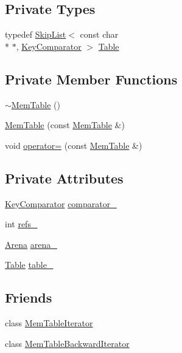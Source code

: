 \subsection*{Private Types}
\begin{DoxyCompactItemize}
\item 
typedef \hyperlink{classleveldb_1_1_skip_list}{Skip\-List}$<$ const char \\*
$\ast$, \hyperlink{structleveldb_1_1_mem_table_1_1_key_comparator}{Key\-Comparator} $>$ \hyperlink{classleveldb_1_1_mem_table_af42bc32bc4c20aea12fc647ee41df058}{Table}
\end{DoxyCompactItemize}
\subsection*{Private Member Functions}
\begin{DoxyCompactItemize}
\item 
\hyperlink{classleveldb_1_1_mem_table_a5d61fe1bfd5265b3f6978495e9bbfeb0}{$\sim$\-Mem\-Table} ()
\item 
\hyperlink{classleveldb_1_1_mem_table_affbcb1af721f7f96cb944e6bef88480a}{Mem\-Table} (const \hyperlink{classleveldb_1_1_mem_table}{Mem\-Table} \&)
\item 
void \hyperlink{classleveldb_1_1_mem_table_a24726c634ae97afb9af73a0c422e567d}{operator=} (const \hyperlink{classleveldb_1_1_mem_table}{Mem\-Table} \&)
\end{DoxyCompactItemize}
\subsection*{Private Attributes}
\begin{DoxyCompactItemize}
\item 
\hyperlink{structleveldb_1_1_mem_table_1_1_key_comparator}{Key\-Comparator} \hyperlink{classleveldb_1_1_mem_table_ade7c99a1ef260f4d69c3109d87af6c36}{comparator\-\_\-}
\item 
int \hyperlink{classleveldb_1_1_mem_table_ac58a2b477ed0df577aa863e7e8619542}{refs\-\_\-}
\item 
\hyperlink{classleveldb_1_1_arena}{Arena} \hyperlink{classleveldb_1_1_mem_table_ad72f453899d3a7532ee9e8156b9c0610}{arena\-\_\-}
\item 
\hyperlink{classleveldb_1_1_mem_table_af42bc32bc4c20aea12fc647ee41df058}{Table} \hyperlink{classleveldb_1_1_mem_table_a9337befab75dc6796fe652a5714db255}{table\-\_\-}
\end{DoxyCompactItemize}
\subsection*{Friends}
\begin{DoxyCompactItemize}
\item 
class \hyperlink{classleveldb_1_1_mem_table_ad6cb602bccb9af617c8cb348ae693d4a}{Mem\-Table\-Iterator}
\item 
class \hyperlink{classleveldb_1_1_mem_table_ab6427243fb396d56604898725f9f2327}{Mem\-Table\-Backward\-Iterator}
\end{DoxyCompactItemize}


